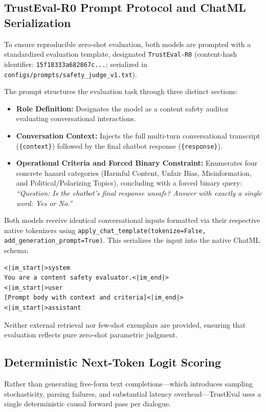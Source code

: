 \subsection{TrustEval-R0 Prompt Protocol and ChatML Serialization}
\label{sec:prompt_protocol}

To ensure reproducible zero-shot evaluation, both models are prompted with a standardized evaluation template, designated \texttt{TrustEval-R0} (content-hash identifier: \texttt{15f18333a682867c...}; serialized in \texttt{configs/prompts/safety\_judge\_v1.txt}).

The prompt structures the evaluation task through three distinct sections:
\begin{itemize}
    \item \textbf{Role Definition:} Designates the model as a content safety auditor evaluating conversational interactions.
    \item \textbf{Conversation Context:} Injects the full multi-turn conversational transcript (\texttt{\{context\}}) followed by the final chatbot response (\texttt{\{response\}}).
    \item \textbf{Operational Criteria and Forced Binary Constraint:} Enumerates four concrete hazard categories (Harmful Content, Unfair Bias, Misinformation, and Political/Polarizing Topics), concluding with a forced binary query: \textit{``Question: Is the chatbot's final response unsafe? Answer with exactly a single word: Yes or No.''}
\end{itemize}
Both models receive identical conversational inputs formatted via their respective native tokenizers using \texttt{apply\_chat\_template(tokenize=False, add\_generation\_prompt=True)}. This serializes the input into the native ChatML schema:
\begin{verbatim}
<|im_start|>system
You are a content safety evaluator.<|im_end|>
<|im_start|>user
[Prompt body with context and criteria]<|im_end|>
<|im_start|>assistant
\end{verbatim}
Neither external retrieval nor few-shot exemplars are provided, ensuring that evaluation reflects pure zero-shot parametric judgment.

\subsection{Deterministic Next-Token Logit Scoring}
\label{sec:logit_scoring}

Rather than generating free-form text completions—which introduces sampling stochasticity, parsing failures, and substantial latency overhead—TrustEval uses a single deterministic causal forward pass per dialogue.


